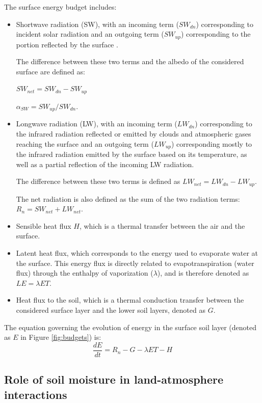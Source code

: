 The surface energy budget includes:
\begin{itemize}
    \item Shortwave radiation (SW), with an incoming term ($SW_{dn}$) corresponding to incident solar radiation and an outgoing term ($SW_{up}$) corresponding to the portion reflected by the surface .

    The difference between these two terms and the albedo of the considered surface are defined as:

    $SW_{net} = SW_{dn} - SW_{up}$

    $\alpha_{SW} = SW_{up}/SW_{dn}$.
    \item Longwave radiation (LW), with an incoming term ($LW_{dn}$) corresponding to the infrared radiation reflected or emitted by clouds and atmospheric gases reaching the surface and an outgoing term ($LW_{up}$) corresponding mostly to the infrared radiation emitted by the surface based on its temperature, as well as a partial reflection of the incoming LW radiation.

    The difference between these two terms is defined as $LW_{net} = LW_{dn} - LW_{up}$.
    
    The net radiation is also defined as the sum of the two radiation terms: $R_{n} = SW_{net} + LW_{net}$.
    \item Sensible heat flux $H$, which is a thermal transfer between the air and the surface.
    \item Latent heat flux, which corresponds to the energy used to evaporate water at the surface. This energy flux is directly related to evapotranspiration (water flux) through the enthalpy of vaporization ($\lambda$), and is therefore denoted as $LE = \lambda ET$.
    \item Heat flux to the soil, which is a thermal conduction transfer between the considered surface layer and the lower soil layers, denoted as $G$.
\end{itemize}

The equation governing the evolution of energy in the surface soil layer (denoted as $E$ in Figure \ref{fig:budgets}) is:
\begin{equation}
    \frac{dE}{dt} = R_{n} - G - \lambda ET - H
\end{equation}

\subsection{Role of soil moisture in land-atmosphere interactions}


